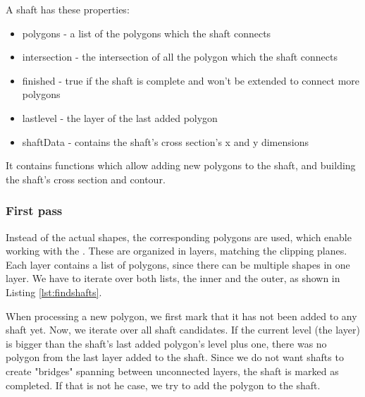 \documentclass[../ClassicThesis.tex]{subfiles}
\begin{document}
A shaft has these properties:
\begin{itemize}
    \item polygons - a list of the polygons which the shaft connects
    \item intersection - the intersection of all the polygon which the shaft connects
    \item finished - true if the shaft is complete and won't be extended to connect more polygons
    \item lastlevel - the layer of the last added polygon
    \item shaftData - contains the shaft's cross section's x and y dimensions
\end{itemize}
It contains functions which allow adding new polygons to the shaft, and building the shaft's cross section and contour.

\subsubsection{First pass}

Instead of the actual shapes, the corresponding polygons are used, which enable working with the \jsclipper. These are organized in layers, matching the clipping planes. Each layer contains a list of polygons, since there can be multiple shapes in one layer. We have to iterate over both lists, the inner and the outer, as shown in Listing \ref{lst:findshafts}.

When processing a new polygon, we first mark that it has not been added to any shaft yet. Now, we iterate over all shaft candidates. If the current level (the layer) is bigger than the shaft's last added polygon's level plus one, there was no polygon from the last layer added to the shaft. Since we do not want shafts to create "bridges" spanning between unconnected layers, the shaft is marked as completed. If that is not he case, we try to add the polygon to the shaft.
\end{document}

